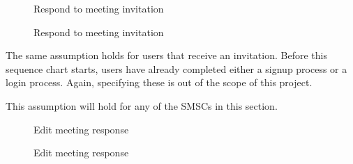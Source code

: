 	
	\begin{figure}[H]
		\centering
		\begin{msc}{Respond to meeting invitation}

			\nextlevel

			\nextlevel
			\nextlevel

			\nextlevel
			\nextlevel

			\nextlevel

			\nextlevel
			\nextlevel

			\nextlevel
		\end{msc}
		\caption{Respond to meeting invitation}
		\label{smsc:respondmeeting}
	\end{figure}
	
	The same assumption holds for users that receive an invitation. Before this sequence chart starts, users have already completed either a signup process or a login process. Again, specifying these is out of the scope of this project.
	
	This assumption will hold for any of the SMSCs in this section.

	\begin{figure}[H]
		\centering
		\begin{msc}{Edit meeting response}
		
			\nextlevel

			\nextlevel
			\nextlevel

			\nextlevel
			\nextlevel

			\nextlevel

			\nextlevel
			\nextlevel

			\nextlevel

		\end{msc}
		\caption{Edit meeting response}
		\label{smsc:editmeetingresp}
	\end{figure}


